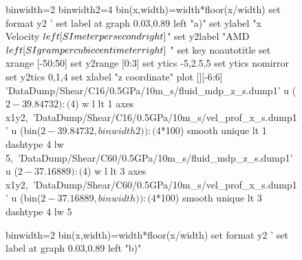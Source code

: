 \documentclass[5p]{elsarticle}
\begin{document}





\begin{figure}[htp]
    	\begin{center}
		\begin{gnuplot}[terminal=epslatex, terminaloptions={size \SERFigwidth cm, \SERFigheight cm color solid}]
			binwidth=2
			binwidth2=4
			bin(x,width)=width*floor(x/width)
			set format y2 '%
			set label at graph 0.03,0.89 left "a)"
			set ylabel "x Velocity $\\left[ \\SI{}{\\meter\\per\\second} \\right]$"
			set y2label "AMD $\\left[ \\SI{}{\\gram\\per\\cubic\\centi\\meter} \\right]$ "
			set key noautotitle
			set xrange [-50:50]
			set y2range [0:3]
			set ytics  -5,2.5,5
			set ytics nomirror
			set y2tics 0,1,4
			set xlabel "z coordinate"  
			plot  	[][-6:6]  'DataDump/Shear/C16/0.5GPa/10m_s/fluid_mdp_z_s.dump1' u ($2-39.84732):($4) w l  lt 1 axes x1y2,\    								
				              'DataDump/Shear/C16/0.5GPa/10m_s/vel_prof_x_s.dump1'  u (bin($2-39.84732,binwidth2)):($4*100) smooth unique lt 1 dashtype 4 lw 5,\	
                             		     'DataDump/Shear/C60/0.5GPa/10m_s/fluid_mdp_z_s.dump1' u ($2-37.16889):($4) w l  lt 3  axes x1y2,\ 								
				              'DataDump/Shear/C60/0.5GPa/10m_s/vel_prof_x_s.dump1'  u (bin($2-37.16889,binwidth)):($4*100) smooth unique lt 3 dashtype 4 lw 5	
		\end{gnuplot}
		\begin{gnuplot}[terminal=epslatex, terminaloptions={size \SERFigwidth cm, \SERFigheight cm color solid}]
			binwidth=2
			bin(x,width)=width*floor(x/width)
			set format y2 '%
			set label at graph 0.03,0.89 left "b)"

\end{gnuplot}
\end{center}
\end{figure}
\end{document}
